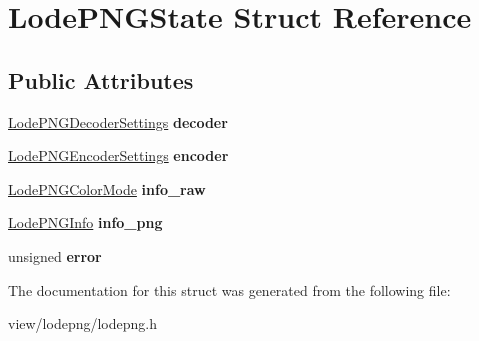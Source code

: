 \hypertarget{struct_lode_p_n_g_state}{\section{Lode\-P\-N\-G\-State Struct Reference}
\label{struct_lode_p_n_g_state}
}
\subsection*{Public Attributes}
\begin{DoxyCompactItemize}
\item 
\hypertarget{struct_lode_p_n_g_state_abd2c38ffc68f04b0e4159e1f97ba1f76}{\hyperlink{struct_lode_p_n_g_decoder_settings}{Lode\-P\-N\-G\-Decoder\-Settings} {\bfseries decoder}}\label{struct_lode_p_n_g_state_abd2c38ffc68f04b0e4159e1f97ba1f76}

\item 
\hypertarget{struct_lode_p_n_g_state_ac63d91db835129d02eb83bbe81de347e}{\hyperlink{struct_lode_p_n_g_encoder_settings}{Lode\-P\-N\-G\-Encoder\-Settings} {\bfseries encoder}}\label{struct_lode_p_n_g_state_ac63d91db835129d02eb83bbe81de347e}

\item 
\hypertarget{struct_lode_p_n_g_state_a597bc08de787147474d43adf8b6ceacf}{\hyperlink{struct_lode_p_n_g_color_mode}{Lode\-P\-N\-G\-Color\-Mode} {\bfseries info\-\_\-raw}}\label{struct_lode_p_n_g_state_a597bc08de787147474d43adf8b6ceacf}

\item 
\hypertarget{struct_lode_p_n_g_state_a08d9ac43c995fcf34d72b1d37047b6fa}{\hyperlink{struct_lode_p_n_g_info}{Lode\-P\-N\-G\-Info} {\bfseries info\-\_\-png}}\label{struct_lode_p_n_g_state_a08d9ac43c995fcf34d72b1d37047b6fa}

\item 
\hypertarget{struct_lode_p_n_g_state_a1a00a050da588cf3c2b7a6252bebb0cd}{unsigned {\bfseries error}}\label{struct_lode_p_n_g_state_a1a00a050da588cf3c2b7a6252bebb0cd}

\end{DoxyCompactItemize}


The documentation for this struct was generated from the following file\-:\begin{DoxyCompactItemize}
\item 
view/lodepng/lodepng.\-h\end{DoxyCompactItemize}
